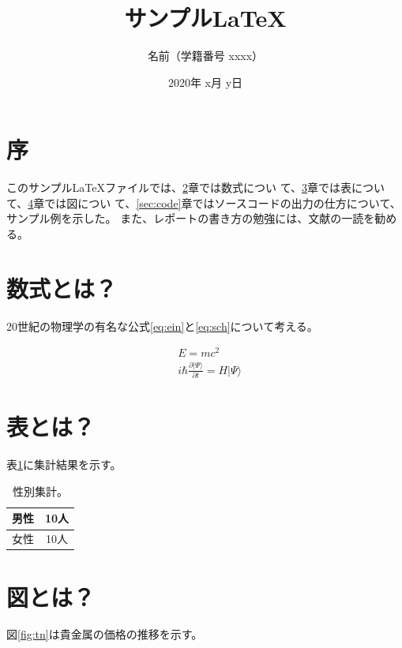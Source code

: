 \documentclass[a4j]{jarticle}
\begin{document}
\title{サンプル\LaTeX}
\author{名前（学籍番号 xxxx）}
\date{2020年 x月 y日}
\maketitle

\section{序}
\label{sec:intro}

このサンプル\LaTeX ファイルでは、\ref{sec:eqn}章では数式につい
て、\ref{sec:table}章では表について、\ref{sec:figure}章では図につい
て、\ref{sec:code}章ではソースコードの出力の仕方について、サンプル例を示した。
また、レポートの書き方の勉強には、文献\cite{Kinoshita}の一読を勧める。

\section{数式とは？}
\label{sec:eqn}

20世紀の物理学の有名な公式\eqref{eq:ein}と\eqref{eq:sch}について考える。

\begin{align}
  \label{eq:ein}
  & E = mc^2\\
  \label{eq:sch}
  & i\hbar\frac{\partial \vert\Psi\rangle}{\partial t} = H\vert\Psi\rangle
\end{align}

\section{表とは？}
\label{sec:table}

表\ref{tab:num}に集計結果を示す。

\begin{table}[ht]
  \centering
  \caption{性別集計。}
  \label{tab:num}
  \begin{tabular}[ht]{|c|c|}
    \hline
    \hline
  男性 & 10人\\
    \hline
  女性 & 10人\\
    \hline
  \end{tabular}
\end{table}

\section{図とは？}
\label{sec:figure}

図\ref{fig:tn}は貴金属の価格の推移を示す。
\end{document}
